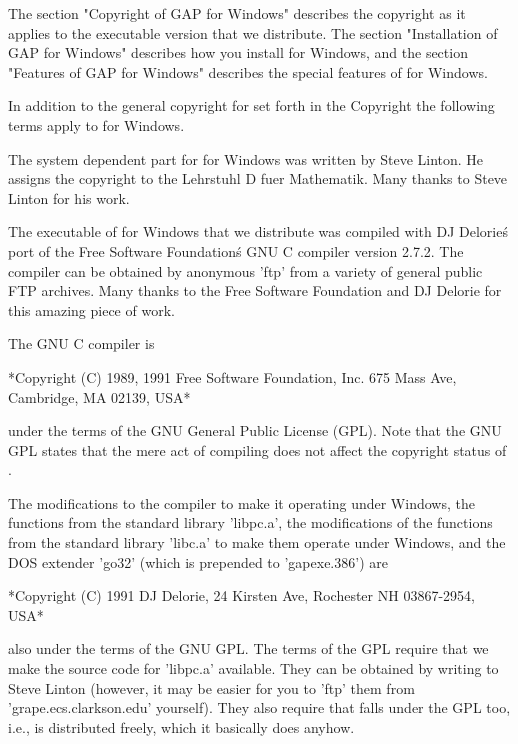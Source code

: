 The section "Copyright of GAP  for Windows" describes  the copyright as it
applies  to the  executable version  that  we  distribute.  The   section
"Installation  of GAP  for Windows"  describes how you  install {\GAP} for
Windows, and  the section "Features    of GAP for  Windows" describes   the
special features of {\GAP} for Windows.


In  addition  to the  general copyright   for  {\GAP} set  forth  in  the
Copyright the following terms apply to {\GAP} for Windows.

The system  dependent  part for {\GAP}  for Windows  was  written by Steve
Linton.  He assigns   the copyright to the  Lehrstuhl  D fuer Mathematik.
Many thanks to Steve Linton for his work.

The executable of {\GAP} for Windows that  we distribute was compiled with
DJ Delorie\'s port   of the Free Software  Foundation\'s  GNU C  compiler
version 2.7.2.   The compiler can be obtained  by  anonymous 'ftp' from a
variety of general public FTP archives.  Many thanks to the Free Software
Foundation and DJ Delorie for this amazing piece of work.

The GNU C compiler is

*Copyright (C) 1989, 1991 Free Software Foundation, Inc.
675 Mass Ave, Cambridge, MA 02139, USA*

under the  terms  of the GNU General Public License (GPL).  Note that the
GNU  GPL  states  that the  mere act  of compiling  does not  affect  the
copyright status of {\GAP}.

The modifications to the compiler to make it operating under  Windows, the
functions from  the standard library 'libpc.a', the  modifications of the
functions from the standard library  'libc.a' to make  them operate under
Windows, and the DOS extender  'go32' (which is prepended to 'gapexe.386')
are

*Copyright (C) 1991 DJ Delorie,
24 Kirsten Ave, Rochester NH 03867-2954, USA*

also under the terms of  the GNU GPL.  The  terms of the GPL require that
we make the source code for 'libpc.a' available.  They can be obtained by
writing to Steve Linton (however, it may be easier for  you to 'ftp' them
from 'grape.ecs.clarkson.edu' yourself).  They  also require  that {\GAP}
falls under the GPL too, i.e.,  is distributed freely, which it basically
does anyhow.

